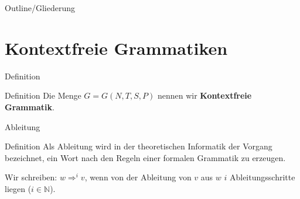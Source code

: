 
\subtitle{Foliensatz 5}
\date{15. November 2012}



\begin{frame}
    \titlepage
\end{frame}

\begin{frame}{Outline/Gliederung}
    \tableofcontents
\end{frame}

\section{Kontextfreie Grammatiken}
\begin{frame}{Definition}
    \begin{block}{Definition}
        Die Menge $G = G \left( N, T, S, P \right)$ nennen wir \textbf{Kontextfreie Grammatik}.
    \end{block}
    \pause
\end{frame}

\begin{frame}{Ableitung}
    \begin{block}{Definition}
        Als Ableitung wird in der theoretischen Informatik der Vorgang bezeichnet, ein Wort nach den Regeln einer formalen Grammatik zu erzeugen.
    \end{block}
    Wir schreiben: $w \Rightarrow^i v$, wenn von der Ableitung von $v$ aus $w$ $i$ Ableitungsschritte liegen ($i \in \mathbb{N}$).
    \pause
\end{frame}

